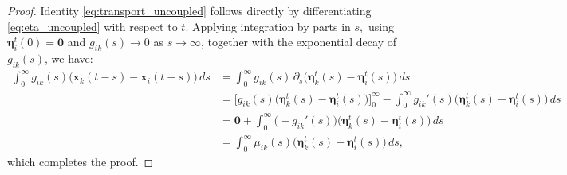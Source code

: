 \documentclass[11pt]{amsart}
\numberwithin{equation}{section}
\begin{document}
\begin{proof}
Identity \eqref{eq:transport_uncoupled} follows directly by differentiating \eqref{eq:eta_uncoupled} with respect to $t$. Applying integration by parts in $s,$ using $\boldsymbol{\eta}_i^t(0)=\mathbf{0}$ and $g_{ik}(s) \rightarrow  0$ as $s\rightarrow \infty$, together with the exponential decay of $g_{ik}(s)$, we have:
{\small
\begin{align*}
\int_{0}^{\infty} g_{ik}(s)\bigl(\boldsymbol{x}_k(t-s)-\boldsymbol{x}_i(t-s)\bigr)\,ds &= \int_0^\infty g_{ik}(s)\, \partial_s \bigl(\boldsymbol{\eta}_k^t(s) - \boldsymbol{\eta}_i^t(s)\bigr)\, ds \\
&= \Big[g_{ik}(s)\big(\boldsymbol{\eta}_k^t(s)-\boldsymbol{\eta}_i^t(s)\big)\Big]_0^\infty - \int_0^\infty g_{ik}'(s)\big(\boldsymbol{\eta}_k^t(s) - \boldsymbol{\eta}_i^t(s)\big)\,ds \\
&= \mathbf{0} + \int_0^\infty \big(-g_{ik}'(s)\big)\big(\boldsymbol{\eta}_k^t(s) - \boldsymbol{\eta}_i^t(s)\big)\,ds \\
&= \int_0^\infty \mu_{ik}(s) \bigl(\boldsymbol{\eta}_k^t(s) - \boldsymbol{\eta}_i^t(s)\bigr)\, ds,
\end{align*}
}
which completes the proof.
\end{proof}
\end{document}
